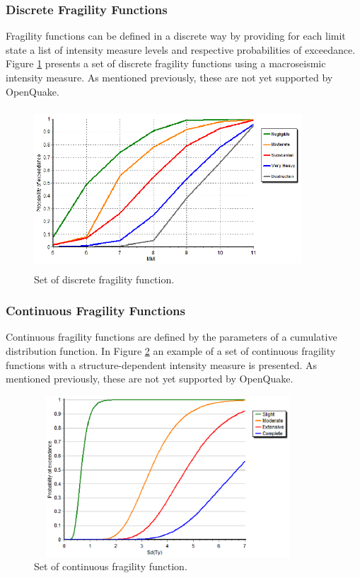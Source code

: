 \subsubsection{Discrete Fragility Functions}
Fragility functions can be defined in a discrete way by providing for each limit state a list of intensity measure levels and respective probabilities of exceedance. Figure \ref{fig:FFDiscrete} presents a set of discrete fragility functions using a macroseismic intensity measure. As mentioned previously, these are not yet supported by OpenQuake.

\begin{figure}[ht]
\centering
\includegraphics[width=10cm,height=6cm]{./Figures/Part_Risk/FFDiscrete.eps}
\caption{Set of discrete fragility function.}
\label{fig:FFDiscrete}
\end{figure}

\subsubsection{Continuous Fragility Functions}
Continuous fragility functions are defined by the parameters of a cumulative distribution function. In Figure \ref{fig:FFcontinuous} an example of a set of continuous fragility functions with a structure-dependent intensity measure is presented. As mentioned previously, these are not yet supported by OpenQuake.

\begin{figure}[ht]
\centering
\includegraphics[width=10cm,height=6cm]{./Figures/Part_Risk/FFContinuous.eps}
\caption{Set of continuous fragility function.}
\label{fig:FFcontinuous}
\end{figure}

